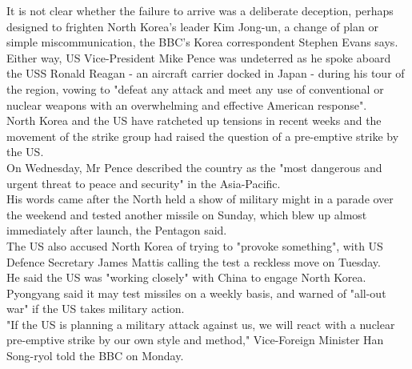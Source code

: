 \documentclass[runningheads,a4paper]{llncs}
\begin{document}
\begin{CJK*}{UTF8}{gbsn}
It is not clear whether the failure to arrive was a deliberate deception, perhaps designed to frighten North Korea's leader \colorbox{red!30}{Kim Jong-un}, a change of plan or simple miscommunication, the \colorbox{red!30}{BBC's Korea correspondent Stephen Evans} says.\\
Either way, US Vice-President Mike Pence was undeterred as he spoke aboard the USS Ronald Reagan - an aircraft carrier docked in Japan - during his tour of the region, vowing to "defeat any attack and meet any use of conventional or nuclear weapons with an overwhelming and effective American response".\\
North Korea and the US have ratcheted up tensions in recent weeks and the movement of the strike group had raised the question of a pre-emptive strike by the US.\\
On Wednesday, Mr Pence described the country as the "most dangerous and urgent threat to peace and security" in the Asia-Pacific.\\
His words came after the North held a show of military might in a parade over the weekend and tested another missile on Sunday, which blew up almost immediately after launch, the Pentagon said.\\
The US also accused North Korea of trying to "provoke something", with US Defence Secretary James Mattis calling the test a reckless move on Tuesday.\\
He said the US was "working closely" with China to engage North Korea.\\
Pyongyang said it may test missiles on a weekly basis, and warned of "all-out war" if the US takes military action.\\
"If the US is planning a military attack against us, we will react with a nuclear pre-emptive strike by our own style and method," Vice-Foreign Minister Han Song-ryol told the BBC on Monday.\\
\end{CJK*}
\end{document}
